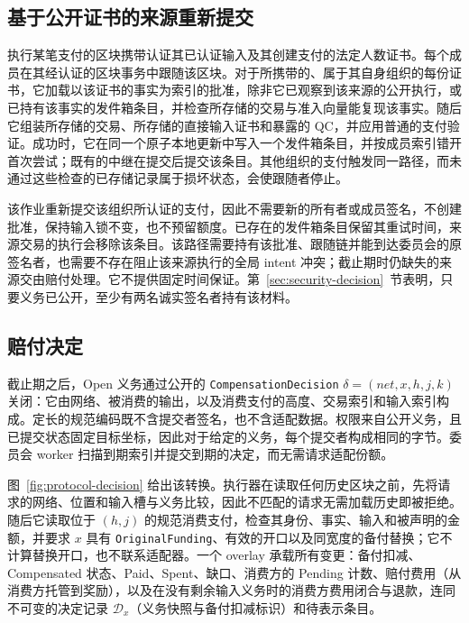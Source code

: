 \subsection{基于公开证书的来源重新提交}
\label{sec:protocol-resubmission}

执行某笔支付的区块携带认证其已认证输入及其创建支付的法定人数证书。每个成员在其经认证的区块事务中跟随该区块。对于所携带的、属于其自身组织的每份证书，它加载以该证书的事实为索引的批准，除非它已观察到该来源的公开执行，或已持有该事实的发件箱条目，并检查所存储的交易与准入向量能复现该事实。随后它组装所存储的交易、所存储的直接输入证书和暴露的 QC，并应用普通的支付验证。成功时，它在同一个原子本地更新中写入一个发件箱条目，并按成员索引错开首次尝试；既有的中继在提交后提交该条目。其他组织的支付触发同一路径，而未通过这些检查的已存储记录属于损坏状态，会使跟随者停止。

该作业重新提交该组织所认证的支付，因此不需要新的所有者或成员签名，不创建批准，保持输入锁不变，也不预留额度。已存在的发件箱条目保留其重试时间，来源交易的执行会移除该条目。该路径需要持有该批准、跟随链并能到达委员会的原签名者，也需要不存在阻止该来源执行的全局 intent 冲突；截止期时仍缺失的来源交由赔付处理。它不提供固定时间保证。第~\ref{sec:security-decision}~节表明，只要义务已公开，至少有两名诚实签名者持有该材料。

\subsection{赔付决定}
\label{sec:protocol-decision}

截止期之后，Open 义务通过公开的 \texttt{CompensationDecision} $\delta=(\mathit{net},x,h,j,k)$ 关闭：它由网络、被消费的输出，以及消费支付的高度、交易索引和输入索引构成。定长的规范编码既不含提交者签名，也不含适配数据。权限来自公开义务，且已提交状态固定目标坐标，因此对于给定的义务，每个提交者构成相同的字节。委员会 worker 扫描到期索引并提交到期的决定，而无需请求适配份额。

图~\ref{fig:protocol-decision} 给出该转换。执行器在读取任何历史区块之前，先将请求的网络、位置和输入槽与义务比较，因此不匹配的请求无需加载历史即被拒绝。随后它读取位于 $(h,j)$ 的规范消费支付，检查其身份、事实、输入和被声明的金额，并要求 $x$ 具有 \texttt{OriginalFunding}、有效的开口以及同宽度的备付替换；它不计算替换开口，也不联系适配器。一个 overlay 承载所有变更：备付扣减、Compensated 状态、Paid、Spent、缺口、消费方的 Pending 计数、赔付费用（从消费方托管到奖励），以及在没有剩余输入义务时的消费方费用闭合与退款，连同不可变的决定记录 $\mathcal D_x$（义务快照与备付扣减标识）和待表示条目。

